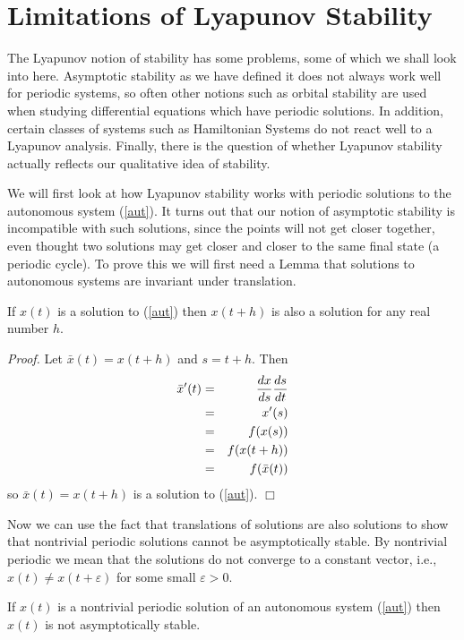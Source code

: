 \documentclass[12pt]{article}
\def\pf{{\em Proof. }}
\def\eps{\varepsilon}
\def\bx{\bar{x}}
\begin{document}
\section {Limitations of Lyapunov Stability}

The Lyapunov notion of stability has some problems, some of which we
shall look into here.  Asymptotic stability as we have defined it does
not always work well for periodic systems, so often other notions such
as orbital stability are used when studying differential equations
which have periodic solutions.  In addition, certain classes of
systems such as Hamiltonian Systems do not react well to a Lyapunov
analysis.  Finally, there is the question of whether Lyapunov
stability actually reflects our qualitative idea of stability.

We will first look at how Lyapunov stability works with periodic
solutions to the autonomous system (\ref{aut}).  It turns out that our
notion of asymptotic stability is incompatible with such solutions,
since the points will not get closer together, even thought two
solutions may get closer and closer to the same final state (a
periodic cycle).  To prove this we will first need a Lemma that
solutions to autonomous systems are invariant under translation.

\begin{lem}
	If $x(t)$ is a solution to (\ref{aut}) then $x(t+h)$ is also a
solution for any real number $h$.
\end{lem}

\pf Let $\bx (t) = x(t+h)$ and $s = t+h$.  Then
\begin{eqnarray*}
	\bx ' (t) & = & {dx \over ds}{ds \over dt} \\
	& = & x'(s)\\
	& = & f(x(s))\\
	& = & f(x(t+h))\\
	& = & f(\bx(t))\\
\end{eqnarray*}
so $\bx(t) = x(t+h)$ is a solution to (\ref{aut}). $\Box$

Now we can use the fact that translations of solutions are also
solutions to show that nontrivial periodic solutions cannot be
asymptotically stable.  By nontrivial periodic we mean that the
solutions do not converge to a constant vector, i.e., $x(t) \neq x(t +
\eps)$ for some small $\eps > 0$.

\begin{thm}
	If $x(t)$ is a nontrivial periodic solution of an autonomous
	system (\ref{aut}) then $x(t)$ is not asymptotically stable.
\end{thm}
\end{document}
